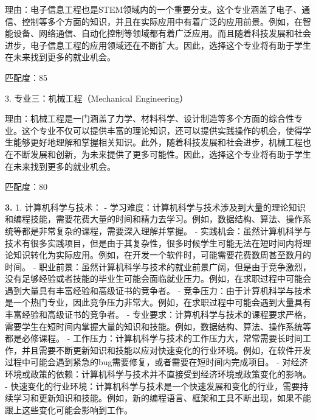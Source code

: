 \documentclass[12pt]{article}
\begin{document}
\begin{CJK*}{UTF8}{gbsn}
理由：电子信息工程也是STEM领域内的一个重要分支。这个专业涵盖了电子、通信、控制等多个方面的知识，并且在实际应用中有着广泛的应用前景。例如，在智能设备、网络通信、自动化控制等领域都有着广泛应用。而且随着科技发展和社会进步，电子信息工程的应用领域还在不断扩大。因此，选择这个专业将有助于学生在未来找到更多的就业机会。

匹配度：85

3. 专业三：机械工程（Mechanical Engineering）

理由：机械工程是一门涵盖了力学、材料科学、设计制造等多个方面的综合性专业。这个专业不仅可以提供丰富的理论知识，还可以提供实践操作的机会，使得学生能够更好地理解和掌握相关知识。此外，随着科技发展和社会进步，机械工程也在不断发展和创新，为未来提供了更多可能性。因此，选择这个专业将有助于学生在未来找到更多的就业机会。

匹配度：80




   \textbf{3.}
   1. 计算机科学与技术：
   - 学习难度：计算机科学与技术涉及到大量的理论知识和编程技能，需要花费大量的时间和精力去学习。例如，数据结构、算法、操作系统等都是非常复杂的课程，需要深入理解并掌握。
   - 实践机会：虽然计算机科学与技术有很多实践项目，但是由于其复杂性，很多时候学生可能无法在短时间内将理论知识转化为实际应用。例如，在开发一个软件时，可能需要花费数周甚至数月的时间。
   - 职业前景：虽然计算机科学与技术的就业前景广阔，但是由于竞争激烈，没有足够经验或者技能的毕业生可能会面临就业压力。例如，在求职过程中可能会遇到大量具有丰富经验和高级证书的竞争者。
   - 竞争压力：由于计算机科学与技术是一个热门专业，因此竞争压力非常大。例如，在求职过程中可能会遇到大量具有丰富经验和高级证书的竞争者。
   - 专业要求：计算机科学与技术的课程要求严格，需要学生在短时间内掌握大量的知识和技能。例如，数据结构、算法、操作系统等都是必修课程。
   - 工作压力：计算机科学与技术的工作压力大，常常需要长时间工作，并且需要不断更新知识和技能以应对快速变化的行业环境。例如，在软件开发过程中可能会遇到紧急的bug需要修复，或者需要在短时间内完成项目。
   - 对经济环境或政策的依赖：计算机科学与技术并不直接受到经济环境或政策变化的影响。
   - 快速变化的行业环境：计算机科学与技术是一个快速发展和变化的行业，需要持续学习和更新知识和技能。例如，新的编程语言、框架和工具不断出现，如果不能跟上这些变化可能会影响到工作。


\end{CJK*}
\end{document}
